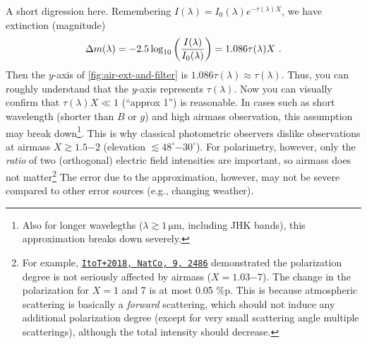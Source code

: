 A short digression here. Remembering $ I(\lambda) = I_0(\lambda) e^{-\tau(\lambda) X} $, we have extinction (magnitude)
\begin{equation*}
  \Delta m(\lambda) 
    = -2.5 \log_{10} \qty( \frac{I(\lambda)}{I_0(\lambda)} ) 
    = 1.086 \tau(\lambda) X ~.
\end{equation*} 
Then the $ y $-axis of \cref{fig:air-ext-and-filter} is $ 1.086 \tau(\lambda) \approx \tau(\lambda) $. Thus, you can roughly understand that the $ y $-axis represents $ \tau(\lambda) $. Now you can visually confirm that $ \tau(\lambda) X \ll 1 $ (``approx 1'') is reasonable. In cases such as short wavelength (shorter than $ B $ or $ g $) and high airmass observation, this assumption may break down\footnote{Also for longer wavelegths ($ \lambda \gtrsim 1 \,\mathrm{\mu m} $, including JHK bands), this approximation breaks down severely.}. This is why classical photometric observers dislike observations at airmass $ X \gtrsim 1.5\mathrm{-}2 $ (elevation $ \lesssim 48^\circ \mathrm{-} 30^\circ$). For polarimetry, however, only the \emph{ratio} of two (orthogonal) electric field intensities are important, so airmass does not matter\footnote{For example, \href{https://ui.adsabs.harvard.edu/abs/2018NatCo...9.2486I/abstract}{\texttt{ItoT+2018, NatCo, 9, 2486}} demonstrated the polarization degree is not seriously affected by airmass ($ X = 1.03 \mathrm{-} 7 $). The change in the polarization for $ X = 1 $ and 7 is at most 0.05 \%p. This is because atmospheric scattering is basically a \emph{forward} scattering, which should not induce any additional polarization degree (except for very small scattering angle multiple scatterings), although the total intensity should decrease.} The error due to the approximation, however, may not be severe compared to other error sources (e.g., changing weather). 

